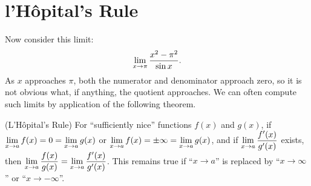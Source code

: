 \begin{exercises}


\end{exercises}











\section{l'H\^{o}pital's Rule}


Now consider this limit:
$$\lim_{x\to \pi}{x^2-\pi^2\over \sin x}.$$
As $x$ approaches $\pi$, both the numerator and denominator approach
zero, so it is not obvious what, if anything, the quotient
approaches. We can often compute such limits by application of the
following theorem.

\begin{theorem} (L'H\^opital's Rule) For ``sufficiently nice'' functions $f(x)$
and $g(x)$, if $\displaystyle\lim_{x\to a} f(x)= 0 = \lim_{x\to a}
g(x)$ or $\displaystyle\lim_{x\to a} f(x)= \pm\infty = \lim_{x\to a}
g(x)$, and if $\displaystyle\lim_{x\to a}{f'(x)\over g'(x)}$ exists,
then $\displaystyle\lim_{x\to a}{f(x)\over g(x)}=\lim_{x\to
a}{f'(x)\over g'(x)}$.  This remains true if ``$x\to a$'' is replaced
by ``$x\to \infty$'' or ``$x\to -\infty$''.
\end{theorem}

